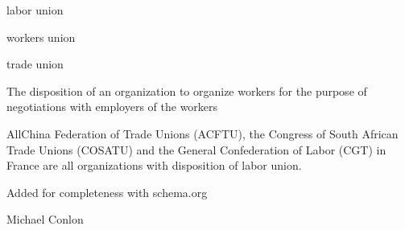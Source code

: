 \documentclass[letterpaper,10pt,english]{sphinxmanual}
\begin{document}
\begin{sphinxShadowBox}

\sphinxAtStartPar
labor union
\end{sphinxShadowBox}

\begin{sphinxShadowBox}

\sphinxAtStartPar
workers union

\sphinxAtStartPar
trade union
\end{sphinxShadowBox}

\begin{sphinxShadowBox}

\sphinxAtStartPar
{\hyperref[\detokenize{doc-BFO_0000016::doc}]{}}
\end{sphinxShadowBox}

\begin{sphinxShadowBox}

\sphinxAtStartPar
The disposition of an organization to organize workers for the purpose of negotiations with employers of the workers
\end{sphinxShadowBox}

\begin{sphinxShadowBox}

\sphinxAtStartPar
{}
\end{sphinxShadowBox}

\begin{sphinxShadowBox}

\sphinxAtStartPar
All\sphinxhyphen{}China Federation of Trade Unions (ACFTU), the Congress of South African Trade Unions (COSATU) and the General Confederation of Labor (CGT) in France are all organizations with disposition of labor union.
\end{sphinxShadowBox}

\begin{sphinxShadowBox}

\sphinxAtStartPar
Added for completeness with schema.org
\end{sphinxShadowBox}

\begin{sphinxShadowBox}

\sphinxAtStartPar
Michael Conlon 
\end{sphinxShadowBox}
\begin{quote}

\ignorespaces \end{quote}
\end{document}
